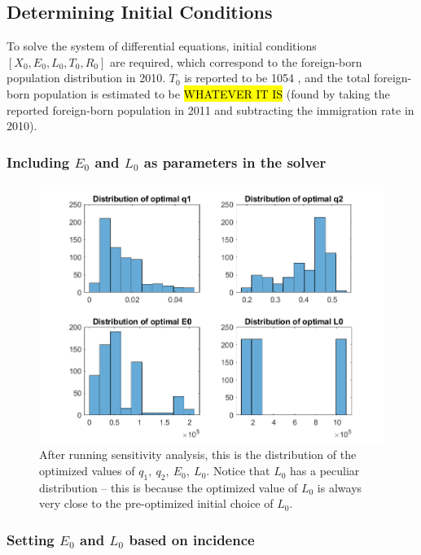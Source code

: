 \documentclass[sn-mathphys,Numbered]{sn-jnl}%
\theoremstyle{thmstyleone}%
\theoremstyle{thmstyletwo}%
\theoremstyle{thmstylethree}%
\begin{document}
\subsection{Determining Initial Conditions}

To solve the system of differential equations, initial conditions $[X_0, E_0, L_0, T_0, R_0]$ are required, which correspond to the foreign-born population distribution in 2010.  $T_0$ is reported to be 1054 \cite{MounchiliA.2022TuberculosisReport}, and the total foreign-born population is estimated to be \hl{WHATEVER IT IS} (found by taking the reported foreign-born population in 2011 and subtracting the immigration rate in 2010).

\subsubsection{Including $E_0$ and $L_0$ as parameters in the solver}



\begin{figure}
    \includegraphics[width=15cm]{Optimized parameter distribution across sensitivity analysis.png}
    
    \caption{After running sensitivity analysis, this is the distribution of the optimized values of $q_1,~q_2,~E_0,~L_0.$  Notice that $L_0$ has a peculiar distribution -- this is because the optimized value of $L_0$ is always very close to the pre-optimized initial choice of $L_0$.}
    \label{fig:OptimizedParameterDistribution}
\end{figure}

\subsubsection{Setting $E_0$ and $L_0$ based on incidence}
\end{document}
